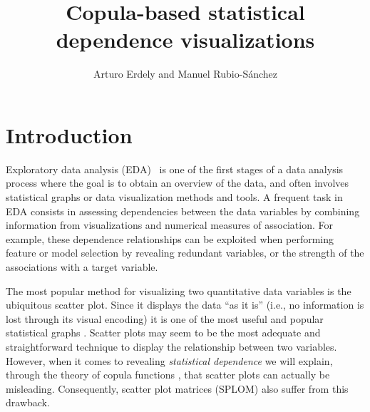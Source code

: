 \documentclass[journal]{vgtc}                %
\title{Copula-based statistical dependence visualizations}
\author{Arturo Erdely and Manuel Rubio-S\'{a}nchez}
\begin{document}


\maketitle

\section{Introduction}

Exploratory data analysis (EDA)~\cite{Tukey77} is one of the first stages of a data analysis process where the goal is to obtain an overview of the data, and often involves statistical graphs or data visualization methods and tools. A frequent task in EDA consists in assessing dependencies between the data variables by combining information from visualizations and numerical measures of association. For example, these dependence relationships can be exploited when performing feature or model selection \cite{Hall00,Guyon03,May11,Krause14} by revealing redundant variables, or the strength of the associations with a target variable.



The most popular method for visualizing two quantitative data variables is the ubiquitous scatter plot. Since it displays the data ``as it is'' (i.e., no information is lost through its visual encoding) it is one of the most useful and popular statistical graphs \cite{friendly05}. Scatter plots may seem to be the most adequate and straightforward technique to display the relationship between two variables. However, when it comes to revealing \textit{statistical dependence} we will explain, through the theory of copula functions \cite{Nelsen1999}, that scatter plots can actually be misleading. Consequently, scatter plot matrices (SPLOM) \cite{Carr87} also suffer from this drawback.
\end{document}
